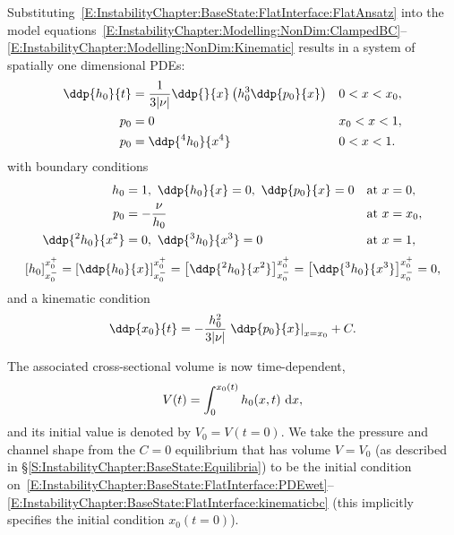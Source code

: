 Substituting~\eqref{E:InstabilityChapter:BaseState:FlatInterface:FlatAnsatz} into the model equations~\eqref{E:InstabilityChapter:Modelling:NonDim:ClampedBC}--\eqref{E:InstabilityChapter:Modelling:NonDim:Kinematic}  results in a system of spatially one dimensional PDEs:
\begin{align}
\ddp{h_0}{t} & = \frac{1}{3|\nu|}\ddp{}{x}\left(h_0^3 \ddp{p_0}{x}\right) & &0 < x < x_0,\label{E:InstabilityChapter:BaseState:FlatInterface:PDEwet}\\
 p_0 &=0 & & x_0 < x < 1,\label{E:InstabilityChapter:BaseState:FlatInterface:PDEdry}\\
p_0 &= \ddp{^4 h_0}{x^4} & & 0 < x < 1.\label{E:InstabilityChapter:BaseState:FlatInterface:pressure2shape}
\end{align}
with boundary conditions
\begin{align}
h_0 &= 1, ~\ddp{h_0}{x} = 0, ~\ddp{p_0}{x} = 0 & &\text{at}~x = 0,\label{E:InstabilityChapter:BaseState:FlatInterface:bc0}\\
p_0 &= -\frac{\nu}{h_0}& &\text{at}~x = x_0,\label{E:InstabilityChapter:BaseState:FlatInterface:pressurebc}\\
\ddp{^2 h_0}{x^2} &=0,~ \ddp{^3 h_0}{x^3} = 0 & &\text{at}~x = 1,\label{E:InstabilityChapter:BaseState:FlatInterface:bc1}
\end{align}
\begin{equation}\label{E:InstabilityChapter:BaseState:FlatInterface:jumpbc}
\left[h_0\right]_{x_0^-}^{x_0^+} = \left[\ddp{h_0}{x}\right]_{x_0^-}^{x_0^+}   = \left[\ddp{^2 h_0}{x^2}\right]_{x_0^-}^{x_0^+} = \left[\ddp{^3 h_0}{x^3 }\right]_{x_0^-}^{x_0^+}   = 0,
\end{equation}
and a kinematic condition
\begin{equation}\label{E:InstabilityChapter:BaseState:FlatInterface:kinematicbc}
\ddp{x_0}{t} = -\frac{h_0^2}{3|\nu|}\left.\ddp{p_0}{x}\right|_{x = x_0} + C.
\end{equation}

The associated cross-sectional volume is now time-dependent,
\begin{equation}\label{E:InstabilityChapter:BaseState:FlatInterface:cross_sect_volume}
V(t) = \int_0^{x_0(t)} h_0(x, t) ~\mathrm{d}x,
\end{equation}
and its initial value is denoted by $V_0 = V(t = 0)$.
We take the pressure and channel shape from the $C = 0$ equilibrium that has volume $V = V_0$ (as described in \S\ref{S:InstabilityChapter:BaseState:Equilibria}) to be the initial condition on~\eqref{E:InstabilityChapter:BaseState:FlatInterface:PDEwet}--\eqref{E:InstabilityChapter:BaseState:FlatInterface:kinematicbc} (this implicitly specifies the initial condition $x_0(t=0)$).

